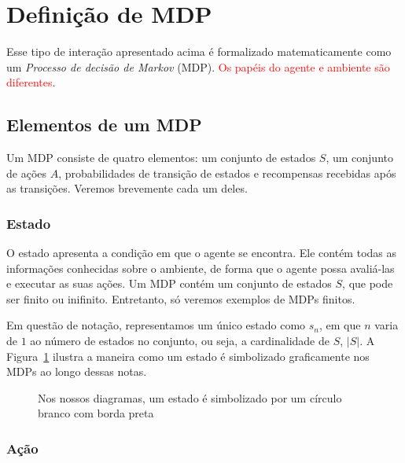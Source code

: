 \documentclass{article}
\begin{document}
    \section{Definição de MDP}
    
        Esse tipo de interação apresentado acima é formalizado matematicamente como um \emph{Processo de decisão de Markov} (MDP). \textcolor{red}{Os papéis do agente e ambiente são diferentes}.
    
        \subsection{Elementos de um MDP}
    
            Um MDP consiste de quatro elementos: um conjunto de estados $S$, um conjunto de ações $A$, probabilidades de transição de estados e recompensas recebidas após as transições. Veremos brevemente cada um deles.
    
            \subsubsection{Estado}

                O estado apresenta a condição em que o agente se encontra. Ele contém todas as informações conhecidas sobre o ambiente, de forma que o agente possa avaliá-las e executar as suas ações. Um MDP contém um conjunto de estados $S$, que pode ser finito ou inifinito. Entretanto, só veremos exemplos de MDPs finitos. 
                
                Em questão de notação, representamos um único estado como $s_n$, em que $n$ varia de $1$ ao número de estados no conjunto, ou seja, a cardinalidade de $S$, $\vert S \vert$. A Figura~\ref{diag:state-node} ilustra a maneira como um estado é simbolizado graficamente nos MDPs ao longo dessas notas.

                \begin{figure}[ht]
                    \centering
                    \caption{Nos nossos diagramas, um estado é simbolizado por um círculo branco com borda preta}
                    \label{diag:state-node}
                \end{figure}
                
            \subsubsection{Ação}
            
\end{document}
